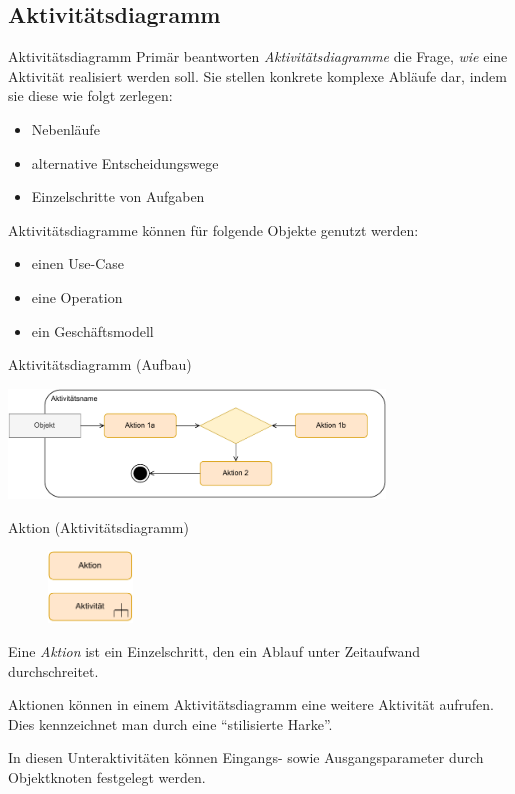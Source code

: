 \subsection{Aktivitätsdiagramm}

\begin{defi}{Aktivitätsdiagramm}
    Primär beantworten \emph{Aktivitätsdiagramme} die Frage, \emph{wie} eine Aktivität realisiert werden soll.
    Sie stellen konkrete komplexe Abläufe dar, indem sie diese wie folgt zerlegen:
    \begin{itemize}
        \item Nebenläufe
        \item alternative Entscheidungswege
        \item Einzelschritte von Aufgaben
    \end{itemize}

    Aktivitätsdiagramme können für folgende Objekte genutzt werden:
    \begin{itemize}
        \item einen Use-Case
        \item eine Operation
        \item ein Geschäftsmodell
    \end{itemize}
\end{defi}

\begin{diag}{Aktivitätsdiagramm (Aufbau)}
    \begin{center}
        \includegraphics[width=0.75\textwidth]{includes/figures/defi_diagrams_activity_intro.pdf}
    \end{center}
\end{diag}

\begin{diag}{Aktion (Aktivitätsdiagramm)}
    \begin{figure}
        \centering
        \includegraphics[width=0.2\textwidth]{includes/figures/defi_diagrams_activity_aktion.pdf}
    \end{figure}
    Eine \emph{Aktion} ist ein Einzelschritt, den ein Ablauf unter Zeitaufwand durchschreitet.

    Aktionen können in einem Aktivitätsdiagramm eine weitere Aktivität aufrufen.
    Dies kennzeichnet man durch eine \enquote{stilisierte Harke}.

    In diesen Unteraktivitäten können Eingangs- sowie Ausgangsparameter durch Objektknoten festgelegt werden.
\end{diag}

